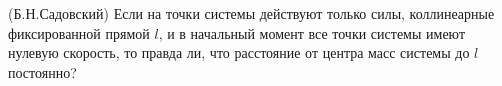(Б.Н.Садовский)
Если на точки системы действуют только силы, коллинеарные фиксированной
прямой $l$, и в начальный момент все точки системы имеют нулевую
скорость, то правда ли, что расстояние от центра масс системы до $l$
постоянно?
